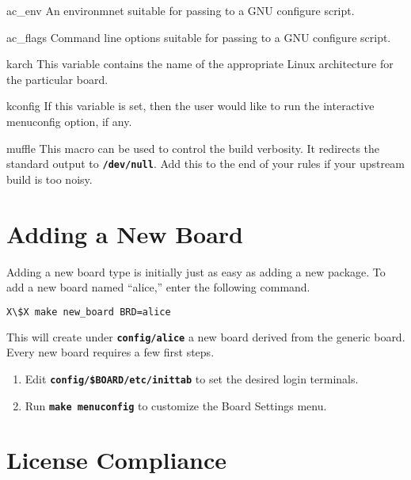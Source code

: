 \documentclass[a4paper,10pt]{article}
\newenvironment{Description}[1][\quad]{%
  \begin{list}{}{%
      \renewcommand{\makelabel}[1]{\textbf{##1}\hfill}%
      \settowidth{\labelwidth}{\textbf{#1}}%
      \setlength{\leftmargin}{\labelwidth+\labelsep}%
  }%
}{%
  \end{list}%
}
\newcommand{\fw}{\tt\bf}
\begin{document}
\begin{Description}[HOSTCCX]
    \item[ac\_env]
      An environmnet suitable for passing to a GNU configure script.

    \item[ac\_flags]
      Command line options suitable for passing to a GNU configure
      script.

    \item[karch]
      This variable contains the name of the appropriate Linux
      architecture for the particular board.

    \item[kconfig]
      If this variable is set, then the user would like to run the
      interactive menuconfig option, if any.

    \item[muffle]
      This macro can be used to control the build verbosity. It
      redirects the standard output to {\fw /dev/null}. Add this to
      the end of your rules if your upstream build is too noisy.

    \end{Description}

\section{Adding a New Board}

    Adding a new board type is initially just as easy as adding a new
    package. To add a new board named ``alice,'' enter the following
    command.

\begin{lstlisting}[language=bash,escapechar=X]
X\$X make new_board BRD=alice
\end{lstlisting}

   This will create under {\fw config/alice} a new board derived from
   the generic board. Every new board requires a few first steps.

   \begin{enumerate}
   \item Edit {\fw config/\$BOARD/etc/inittab} to set the desired login terminals.
   \item Run {\fw make menuconfig} to customize the Board Settings menu.
   \end{enumerate}

\section{License Compliance}
\end{document}
